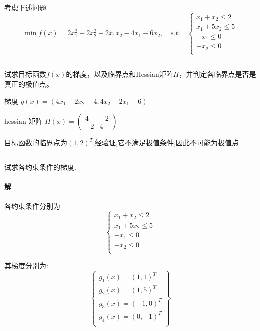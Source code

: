\documentclass[a4paper]{article}
\begin{document}
考虑下述问题 \[\min f(x) = 2x_1^2 + 2x_2^2 -2x_1x_2 -4x_1 - 6x_2, \quad s.t. \quad \left\{\begin{array}{c}
    x_1 + x_2 \leq 2 \\
    x_1 + 5x_2 \leq 5 \\
    -x_1 \leq 0 \\
    -x_2 \leq 0 \\
\end{array}\right.\]

\subsection{}

试求目标函数$f(x)$的梯度，以及临界点和Hessian矩阵$H$，并判定各临界点是否是真正的极值点。

梯度 $g(x) = (4x_1 -2x_2 - 4,4x_2 -2x_1-6)$

hessian 矩阵 \(H(x) = \left(\begin{matrix}
    4 & -2\\
    -2 & 4
\end{matrix}\right)\)

目标函数的临界点为$(1,2)^T$,经验证,它不满足极值条件,因此不可能为极值点

\subsection{}

试求各约束条件的梯度.

\paragraph{解}
各约束条件分别为
\[\left\{\begin{array}{c}
    x_1 + x_2 \leq 2 \\
    x_1 + 5x_2 \leq 5 \\
    -x_1 \leq 0 \\
    -x_2 \leq 0 \\
\end{array}\right.\]

其梯度分别为:
\[\left\{
\begin{array}{c}
    g_1(x) = (1,1)^T \\
    g_2(x) = (1,5) ^T\\
    g_3(x)=(-1,0)^T \\
    g_4(x) = (0,-1)^T\\
\end{array}
\right\}\]
\end{document}
